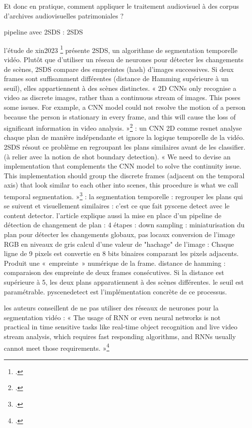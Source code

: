 Et donc en pratique, comment appliquer le traitement audiovisuel à des corpus d'archives audiovisuelles patrimoniales ? 

pipeline avec 2SDS : 
\subitem 2SDS

l'étude de xin2023 \footcite{xin2023} présente 2SDS, un algorithme de segmentation temporelle vidéo. Plutôt que d’utiliser un réseau de neurones pour détecter les changements de scènes, 2SDS compare des empreintes (hash) d’images successives. Si deux frames sont suffisamment différentes (distance de Hamming supérieure à un seuil), elles appartiennent à des scènes distinctes.
« 2D CNNs only recognise a video as discrete images, rather than a continuous stream of images. This poses some issues. For example, a CNN model could not resolve the motion of a person because the person is stationary in every frame, and this will cause the loss of significant information in video analysis. »\footcite{xin2023} : un CNN 2D comme resnet analyse chaque plan de manière indépendante et ignore la logique temporelle de la vidéo. 2SDS résout ce problème en regroupant les plans similaires avant de les classifier. (à relier avec la notion de shot boundary detection). 
« We need to devise an implementation that complements the CNN model to solve the continuity issue. This implementation should group the discrete frames (adjacent on the temporal axis) that look similar to each other into scenes, this procedure is what we call temporal segmentation. »\footcite{xin2023} : la segmentation temporelle : regrouper les plans qui se suivent et visuellement similaires : c'est ce que fait pyscene detect avec le content detector. 
l'article explique aussi la mise en place d'un pipeline de détection de changement de plan : 
4 étapes : 
\subitem down sampling : miniaturisation du plan pour détecter les changements globaux, pas locaux
\subitem conversion de l'image RGB en niveaux de gris 
\subitem calcul d'une valeur de "hachage" de l'image : Chaque ligne de 9 pixels est convertie en 8 bits binaires comparant les pixels adjacents. Produit une « empreinte » numérique de la frame.
\subitem distance de hamming : 
comparaison des empreinte de deux frames consécutives. Si la distance est supérieure à 5, les deux plans apparatiennent à des scènes différentes. le seuil est paramétrable. pyscenedetect est l'implémentation concrète de ce processus. 

les auteurs conseillent de ne pas utiliser des réseaux de neurones pour la segmentation vidéo : « The usage of RNN or even neural networks is not practical in time sensitive tasks like real-time object recognition and live video stream analysis, which requires fast responding algorithms, and RNNs usually cannot meet those requirements. »\footcite{xin2023}

